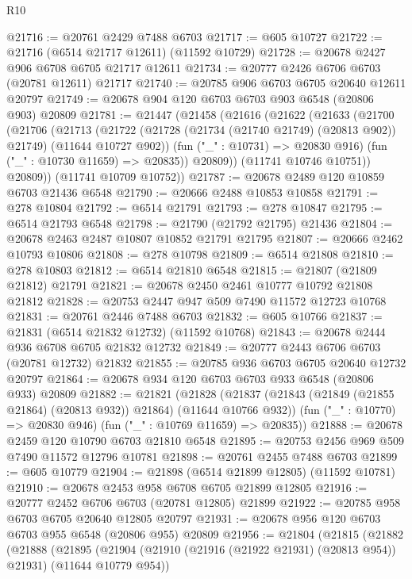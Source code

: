 \begin{lexlean}{R10}
\begin{coremodule}
@21716 := @20761 @2429 @7488 @6703
@21717 := @605 @10727
@21722 := @21716 (@6514 @21717 @12611) (@11592 @10729)
@21728 := @20678 @2427 @906 @6708 @6705 @21717 @12611
@21734 := @20777 @2426 @6706 @6703 (@20781 @12611) @21717
@21740 := @20785 @906 @6703 @6705 @20640 @12611 @20797
@21749 := @20678 @904 @120 @6703 @6703 @903 @6548 (@20806 @903) @20809
@21781 := @21447
    (@21458
      (@21616
        (@21622
          (@21633
            (@21700
              (@21706
                (@21713
                  (@21722
                    (@21728 (@21734 (@21740 @21749) (@20813 @902)) @21749)
                    (@11644 @10727 @902))
                  (fun ("_" : @10731) => @20830 @916)
                  (fun ("_" : @10730 @11659) => @20835))
                @20809))
            (@11741 @10746 @10751))
          @20809))
      (@11741 @10709 @10752))
@21787 := @20678 @2489 @120 @10859 @6703 @21436 @6548
@21790 := @20666 @2488 @10853 @10858
@21791 := @278 @10804
@21792 := @6514 @21791
@21793 := @278 @10847
@21795 := @6514 @21793 @6548
@21798 := @21790 (@21792 @21795) @21436
@21804 := @20678 @2463 @2487 @10807 @10852 @21791 @21795
@21807 := @20666 @2462 @10793 @10806
@21808 := @278 @10798
@21809 := @6514 @21808
@21810 := @278 @10803
@21812 := @6514 @21810 @6548
@21815 := @21807 (@21809 @21812) @21791
@21821 := @20678 @2450 @2461 @10777 @10792 @21808 @21812
@21828 := @20753 @2447 @947 @509 @7490 @11572 @12723 @10768
@21831 := @20761 @2446 @7488 @6703
@21832 := @605 @10766
@21837 := @21831 (@6514 @21832 @12732) (@11592 @10768)
@21843 := @20678 @2444 @936 @6708 @6705 @21832 @12732
@21849 := @20777 @2443 @6706 @6703 (@20781 @12732) @21832
@21855 := @20785 @936 @6703 @6705 @20640 @12732 @20797
@21864 := @20678 @934 @120 @6703 @6703 @933 @6548 (@20806 @933) @20809
@21882 := @21821
    (@21828
      (@21837 (@21843 (@21849 (@21855 @21864) (@20813 @932)) @21864) (@11644 @10766 @932))
      (fun ("_" : @10770) => @20830 @946)
      (fun ("_" : @10769 @11659) => @20835))
@21888 := @20678 @2459 @120 @10790 @6703 @21810 @6548
@21895 := @20753 @2456 @969 @509 @7490 @11572 @12796 @10781
@21898 := @20761 @2455 @7488 @6703
@21899 := @605 @10779
@21904 := @21898 (@6514 @21899 @12805) (@11592 @10781)
@21910 := @20678 @2453 @958 @6708 @6705 @21899 @12805
@21916 := @20777 @2452 @6706 @6703 (@20781 @12805) @21899
@21922 := @20785 @958 @6703 @6705 @20640 @12805 @20797
@21931 := @20678 @956 @120 @6703 @6703 @955 @6548 (@20806 @955) @20809
@21956 := @21804
    (@21815
      (@21882
        (@21888
          (@21895
            (@21904 (@21910 (@21916 (@21922 @21931) (@20813 @954)) @21931) (@11644 @10779 @954))

\end{coremodule}
\end{lexlean}
